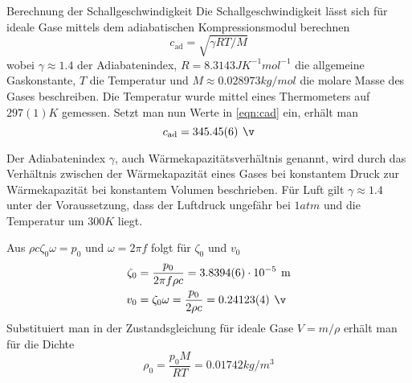 \documentclass{alex_gp}
\begin{document}
\begin{mybox}{Berechnung der Schallgeschwindigkeit}
	Die Schallgeschwindigkeit lässt sich für ideale Gase mittels dem adiabatischen Kompressionsmodul berechnen 
	\begin{equation}\label{eqn:cad}
		c_{\text{ad}} = \sqrt{\gamma RT/M}
	\end{equation}
	wobei \( \gamma \approx 1.4 \) der Adiabatenindex, \( R = 8.3143 \unit{J K^{-1} mol^{-1}} \) die allgemeine Gaskonstante, \( T \) die Temperatur und \( M \approx 0.028973 \unit{kg/mol} \) die molare Masse des Gases beschreiben.
	Die Temperatur wurde mittel eines Thermometers auf \( 297(1) \unit{K} \) gemessen. 
	Setzt man nun Werte in \autoref{eqn:cad} ein, erhält man 
	\begin{equation}\label{eqn:cad2}
		c_{\text{ad}} = 345.45(6) \unit{\v}
	\end{equation}
	
	
	
	Der Adiabatenindex \( \gamma \), auch Wärmekapazitätsverhältnis genannt, wird durch das Verhältnis zwischen der Wärmekapazität eines Gases bei konstantem Druck zur Wärmekapazität bei konstantem Volumen beschrieben. 
	Für Luft gilt \( \gamma \approx 1.4 \) unter der Voraussetzung, dass der Luftdruck ungefähr bei \( 1 \unit{atm} \) und die Temperatur um \( 300 \unit{K} \) liegt.
	
	Aus \( 	\rho c \zeta_0 \omega = p_0 \) und \( \omega = 2\pi f \) folgt für \( \zeta_0 \) und \( v_0 \)
	\begin{align}\label{eqn:zeta}
		\zeta_0 &= \frac{p_0}{2\pi f\rho c} = 3.8394(6) \cdot 10^{-5} \unit{m} \\
		v_0 &= \zeta_0\omega = \frac{p_0}{2\rho c} = 0.24123(4) \unit{\v}
	\end{align}
	Substituiert man in der Zustandsgleichung für ideale Gase \( V = m/\rho \) erhält man für die Dichte
	\begin{equation}\label{eqn:density}
		\rho_0 = \frac{p_0M}{RT} = 0.01742 \unit{kg/m^3}
	\end{equation}
\end{mybox}
\end{document}
